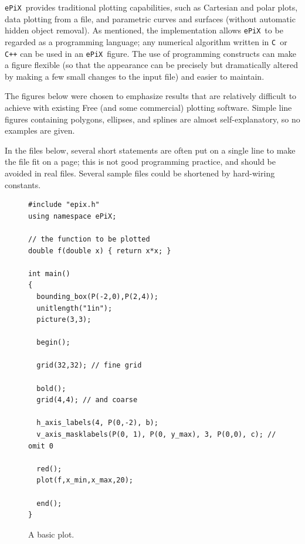 \documentclass[11pt]{article}
\newcommand{\ePiX}{\texttt{ePiX}}
\begin{document}
\ePiX\ provides traditional plotting capabilities, such as Cartesian
and polar plots, data plotting from a file, and parametric curves and
surfaces (without automatic hidden object removal). As mentioned, the 
implementation allows \ePiX\ to be regarded as a programming language;
any numerical algorithm written in \texttt{C}~or \texttt{C++} can be 
used in an \ePiX\ figure. The use of programming constructs can make a
figure flexible (so that the appearance can be precisely but dramatically
altered by making a few small changes to the input file) and easier to
maintain.

The figures below were chosen to emphasize results that are relatively
difficult to achieve with existing Free (and some commercial) plotting
software.  Simple line figures containing polygons, ellipses, and
splines are almost self-explanatory, so no examples are given. 

In the files below, several short statements are often put on a single
line to make the file fit on a page; this is not good programming
practice, and should be avoided in real files. Several sample files
could be shortened by hard-wiring constants.

\clearpage

\begin{figure}[hbt]
\begin{center}

\vspace*{-2in}
\begin{verbatim}
#include "epix.h"
using namespace ePiX;

// the function to be plotted
double f(double x) { return x*x; }

int main() 
{
  bounding_box(P(-2,0),P(2,4));
  unitlength("1in");
  picture(3,3);

  begin();

  grid(32,32); // fine grid

  bold();
  grid(4,4); // and coarse

  h_axis_labels(4, P(0,-2), b);
  v_axis_masklabels(P(0, 1), P(0, y_max), 3, P(0,0), c); // omit 0

  red();
  plot(f,x_min,x_max,20);
  
  end();
}
\end{verbatim}
\caption{A basic plot.}
\label{fig:parabola}
\end{center}
\end{figure}

\clearpage
\end{document}
